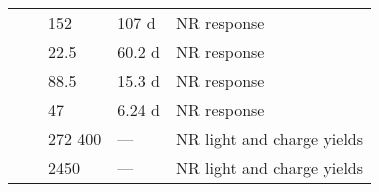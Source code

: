 \begin{table}[h]
\begin{tabular}{lllll}
\hline

\YBe{}	    & \gammaN{}     & 152       & 107 d     & NR response \\ 
\SbBe{}	    & \gammaN{}     & 22.5      & 60.2 d    & NR response \\ 
\BiBeTZF{}	& \gammaN{}     & 88.5      & 15.3 d    & NR response \\ 
\BiBeTZS{}	& \gammaN{}     & 47        & 6.24 d    & NR response \\ 

\hline

\DD{}	& \neutron{}        & 272 \xrightarrow{} 400        & ---     & NR light and charge yields \\ 
\DD{}	& \neutron{}        & 2450                          & ---     & NR light and charge yields \\ 

\bottomrule
\end{tabular}
\end{table}

